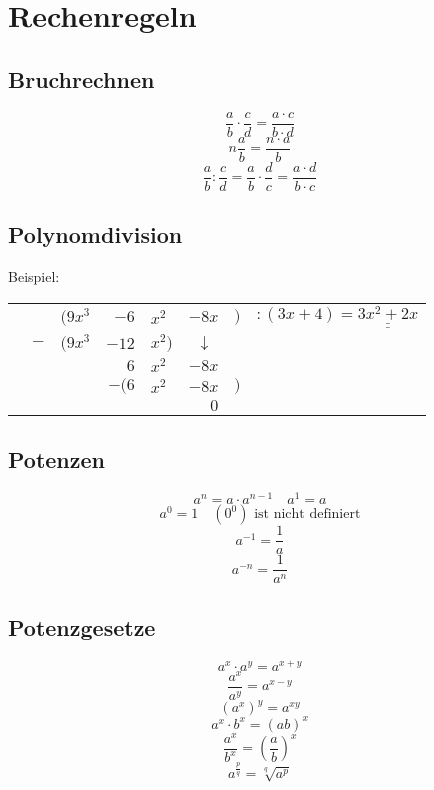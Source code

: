 \section{Rechenregeln}
\subsection{Bruchrechnen}
\[ \boxed{\frac{a}{b} \cdot \frac{c}{d} = \frac{a \cdot c}{b \cdot d}} \]
\[ \boxed{n \frac{a}{b} = \frac{n \cdot a}{b}} \]
\[ \boxed{\frac{a}{b} : \frac{c}{d} = \frac{a}{b} \cdot \frac{d}{c} = \frac{a \cdot d}{b \cdot c}} \]

\subsection{Polynomdivision}
Beispiel: 

\begin{tabular}{|r@{}r@{}r@{}r@{}l@{}r@{}r@{}l|}
\hline
\rule{0pt}{12pt}&&$(9x^3 $&$- 6$&$x^2 $&$- 8x$&$)$&$:(3x + 4) = \underline{\underline{3x^2 + 2x}}$\\
&$-$&$(9x^3 $&$- 12$&$x^2)$&$\downarrow\,\,$&&\\
\cline{2-5}\rule{0pt}{12pt}&&&$6$&$x^2 $&$- 8x$&&\\
&&&$-(6$&$x^2 $&$- 8x$&$)$&\\
\cline{4-7}\rule{0pt}{12pt}&&&&&$0$&&\\
\hline
\end{tabular}


\subsection{Potenzen}
\[ \boxed{a^n = a \cdot a^{n-1} \quad a^1 = a} \]
\[ \boxed{a^0 = 1 \quad \left(0^0\right)\text{ ist nicht definiert}} \]
\[ \boxed{a^{-1} = \frac{1}{a}} \]
\[ \boxed{a^{-n} = \frac{1}{a^n}} \]

\subsection{Potenzgesetze}
\[ \boxed{a^x \cdot a^y = a^{x+y}} \]
\[ \boxed{\frac{a^x}{a^y} = a^{x-y}} \]
\[ \boxed{(a^x)^y = a^{xy}} \]
\[ \boxed{a^x \cdot b^x = \left(ab\right)^x} \]
\[ \boxed{\frac{a^x}{b^x} = \left(\frac{a}{b}\right)^x} \]
\[ \boxed{a^{\frac{p}{q}} = \sqrt[q]{a^p}} \]

